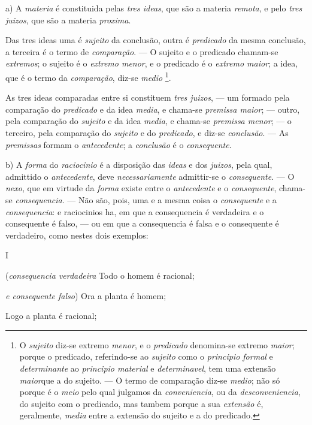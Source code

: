 a) A \emph{materia} é constituida pelas \emph{tres ideas}, que são a materia \emph{remota}, e pelo \emph{tres juizos}, que são a materia \emph{proxima}.

Das tres ideas uma é \emph{sujeito} da conclusão, outra é \emph{predicado} da mesma conclusão, a terceira é o termo de \emph{comparação}. --- O sujeito e o predicado chamam-se \emph{extremos}; o sujeito é o \emph{extremo menor}, e o predicado é o \emph{extremo maior}; a idea, que é o termo da \emph{comparação}, diz-se \emph{medio} \footnote{O \emph{sujeito} diz-se extremo \emph{menor}, e o \emph{predicado} denomina-se extremo \emph{maior}; porque o predicado, referindo-se ao \emph{sujeito} como o \emph{principio formal} e \emph{determinante} ao \emph{principio material} e \emph{determinavel}, tem uma extensão \emph{maior}que a do sujeito. --- O termo de comparação diz-se \emph{medio}; não só porque é o \emph{meio} pelo qual julgamos da \emph{conveniencia}, ou da \emph{desconveniencia}, do sujeito com o predicado, mas tambem porque a sua \emph{extensão} é, geralmente, \emph{media} entre a extensão do sujeito e a do predicado.}.

As tres ideas comparadas entre si constituem \emph{tres juizos}, --- um formado pela comparação do \emph{predicado} e da idea \emph{media}, e chama-se \emph{premissa maior}; --- outro, pela comparação do \emph{sujeito} e da idea \emph{media}, e chama-se \emph{premissa menor}; --- o terceiro, pela comparação do \emph{sujeito} e do \emph{predicado}, e diz-se \emph{conclusão}. --- As \emph{premissas} formam o \emph{antecedente}; a \emph{conclusão} é o \emph{consequente}.

b) A \emph{forma} do \emph{raciocinio} é a disposição das \emph{ideas} e dos \emph{juizos}, pela qual, admittido o \emph{antecedente}, deve \emph{necessariamente} admittir-se o \emph{consequente}. --- O \emph{nexo}, que em virtude da \emph{forma} existe entre o \emph{antecedente} e o \emph{consequente}, chama-se \emph{consequencia}. --- Não são, pois, uma e a mesma coisa o \emph{consequente} e a \emph{consequencia}: e raciocinios ha, em que a consequencia é verdadeira e o consequente é falso, --- ou em que a consequencia é falsa e o consequente é verdadeiro, como nestes dois exemplos:

I

(\emph{consequencia verdadeira}   Todo o homem é racional;

\emph{e consequente falso}) Ora a planta é homem;

Logo a planta é racional;

